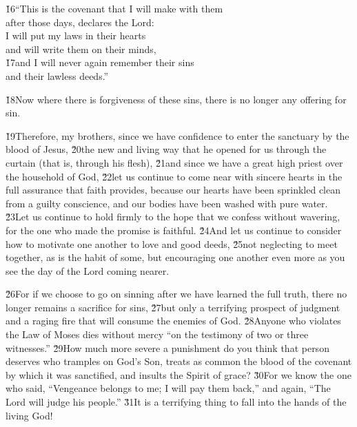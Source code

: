\begin{poetry}
\poeml \v{16}``This is the covenant that I will make with them \\
\poemll    after those days, declares the Lord: \\
\poeml I will put my laws in their hearts \\
\poemll    and will write them on their minds, \\
\poeml \v{17}and I will never again remember their sins \\
\poemll    and their lawless deeds.''
\end{poetry}

\v{18}Now where there is forgiveness of these sins, there is no longer any offering for sin.

\v{19}Therefore, my brothers, since we have confidence to enter the sanctuary by the blood of Jesus, \v{20}the new and living way that he opened for us through the curtain (that is, through his flesh), \v{21}and since we have a great high priest over the household of God, \v{22}let us continue to come near with sincere hearts in the full assurance that faith provides, because our hearts have been sprinkled clean from a guilty conscience, and our bodies have been washed with pure water. \v{23}Let us continue to hold firmly to the hope that we confess without wavering, for the one who made the promise is faithful. \v{24}And let us continue to consider how to motivate one another to love and good deeds, \v{25}not neglecting to meet together, as is the habit of some, but encouraging one another even more as you see the day of the Lord coming nearer.

\v{26}For if we choose to go on sinning after we have learned the full truth, there no longer remains a sacrifice for sins, \v{27}but only a terrifying prospect of judgment and a raging fire that will consume the enemies of God. \v{28}Anyone who violates the Law of Moses dies without mercy ``on the testimony of two or three witnesses.'' \v{29}How much more severe a punishment do you think that person deserves who tramples on God's Son, treats as common the blood of the covenant by which it was sanctified, and insults the Spirit of grace? \v{30}For we know the one who said, ``Vengeance belongs to me; I will pay them back,'' and again, ``The Lord will judge his people.'' \v{31}It is a terrifying thing to fall into the hands of the living God!


